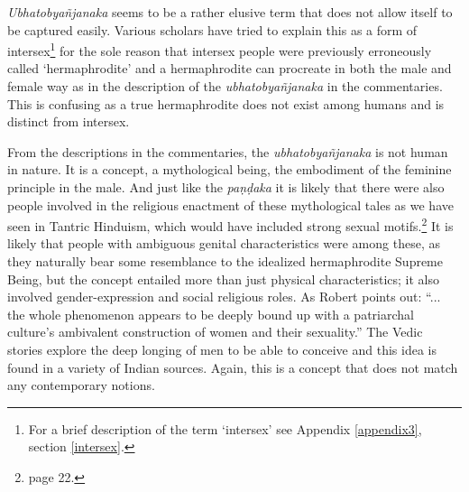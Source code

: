 \textit{Ubhatob­yañ­janaka} seems to be a rather elusive term that does not allow itself to be captured easily. Various scholars have tried to explain this as a form of intersex\footnote{For a brief description of the term `intersex' see Appendix \ref{appendix3}, section \ref{intersex}.} for the sole reason that intersex people were previously erroneously called `hermaphrodite' and a hermaphrodite can procreate in both the male and female way as in the description of the \textit{ubhatob­yañ­janaka} in the commentaries. This is confusing as a true hermaphrodite does not exist among humans and is distinct from intersex. 

From the descriptions in the commentaries, the \textit{ubhatob­yañ­janaka} is not human in nature. It is a concept, a mythological being, the embodiment of the feminine principle in the male. And just like the \textit{paṇḍaka} it is likely that there were also people involved in the religious enactment of these mythological tales as we have seen in Tantric Hinduism, which would have included strong sexual motifs.\footnote{\cite{nanda} page 22.} It is likely that people with ambiguous genital characteristics were among these, as they naturally bear some resemblance to the idealized hermaphrodite Supreme Being, but the concept entailed more than just physical characteristics; it also involved gender-expression and social religious roles. As Robert \cite{goldman} points out: ``... the whole phenomenon appears to be deeply bound up with a patriarchal culture's ambivalent construction of women and their sexuality.'' The Vedic stories explore the deep longing of men to be able to conceive and this idea is found in a variety of Indian sources. Again, this is a concept that does not match any contemporary notions.
